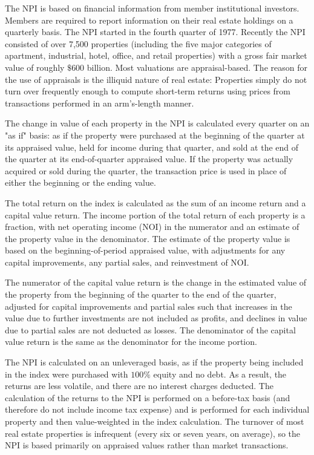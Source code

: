 \documentclass[11pt]{article}
\begin{document}
The NPI is based on financial information from member institutional investors. Members are required to report information on their real estate holdings on a quarterly basis. The NPI started in the fourth quarter of 1977. Recently the NPI consisted of over 7,500 properties (including the five major categories of apartment, industrial, hotel, office, and retail properties) with a gross fair market value of roughly $\$ 600$ billion. Most valuations are appraisal-based. The reason for the use of appraisals is the illiquid nature of real estate: Properties simply do not turn over frequently enough to compute short-term returns using prices from transactions performed in an arm's-length manner.

The change in value of each property in the NPI is calculated every quarter on an "as if" basis: as if the property were purchased at the beginning of the quarter at its appraised value, held for income during that quarter, and sold at the end of the quarter at its end-of-quarter appraised value. If the property was actually acquired or sold during the quarter, the transaction price is used in place of either the beginning or the ending value.

The total return on the index is calculated as the sum of an income return and a capital value return. The income portion of the total return of each property is a fraction, with net operating income (NOI) in the numerator and an estimate of the property value in the denominator. The estimate of the property value is based on the beginning-of-period appraised value, with adjustments for any capital improvements, any partial sales, and reinvestment of NOI.

The numerator of the capital value return is the change in the estimated value of the property from the beginning of the quarter to the end of the quarter, adjusted for capital improvements and partial sales such that increases in the value due to further investments are not included as profits, and declines in value due to partial sales are not deducted as losses. The denominator of the capital value return is the same as the denominator for the income portion.

The NPI is calculated on an unleveraged basis, as if the property being included in the index were purchased with $100 \%$ equity and no debt. As a result, the returns are less volatile, and there are no interest charges deducted. The calculation of the returns to the NPI is performed on a before-tax basis (and therefore do not include income tax expense) and is performed for each individual property and then value-weighted in the index calculation. The turnover of most real estate properties is infrequent (every six or seven years, on average), so the NPI is based primarily on appraised values rather than market transactions.
\end{document}
